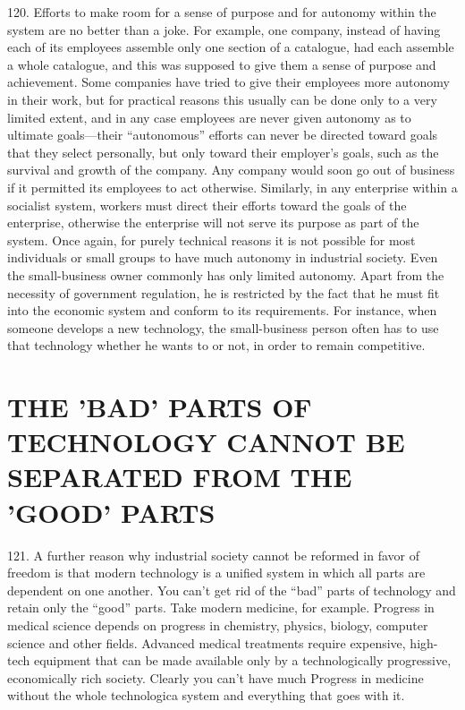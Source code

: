 \documentclass{article}
\begin{document}
120. Efforts to make room for a sense of purpose and for autonomy within the system are no better 
than a joke. For example, one company, instead of having each of its employees assemble only 
one section of a catalogue, had each assemble a whole catalogue, and this was supposed to give 
them a sense of purpose and achievement. Some companies have tried to give their employees 
more autonomy in their work, but for practical reasons this usually can be done only to a very 
limited extent, and in any case employees are never given autonomy as to ultimate goals—their 
“autonomous” efforts can never be directed toward goals that they select personally, but only 
toward their employer’s goals, such as the survival and growth of the company. Any company 
would soon go out of business if it permitted its employees to act otherwise. Similarly, in any 
enterprise within a socialist system, workers must direct their efforts toward the goals of the 
enterprise, otherwise the enterprise will not serve its purpose as part of the system. Once again, 
for purely technical reasons it is not possible for most individuals or small groups to have much 
autonomy in industrial society. Even the small-business owner commonly has only limited 
autonomy. Apart from the necessity of government regulation, he is restricted by the fact that he 
must fit into the economic system and conform to its requirements. For instance, when someone 
develops a new technology, the small-business person often has to use that technology whether he 
wants to or not, in order to remain competitive. 


\section{THE 'BAD' PARTS OF TECHNOLOGY CANNOT BE SEPARATED FROM THE 'GOOD' PARTS}

\hspace{0.5cm} 121. A further reason why industrial society cannot be reformed in favor of freedom is that modern 
technology is a unified system in which all parts are dependent on one another. You can’t get rid 
of the “bad” parts of technology and retain only the “good” parts. Take modern medicine, for 
example. Progress in medical science depends on progress in chemistry, physics, biology, 
computer science and other fields. Advanced medical treatments require expensive, high-tech 
equipment that can be made available only by a technologically progressive, economically rich 
society. Clearly you can’t have much Progress in medicine without the whole technologica
system and everything that goes with it. \vspace{\baselineskip}
\end{document}
